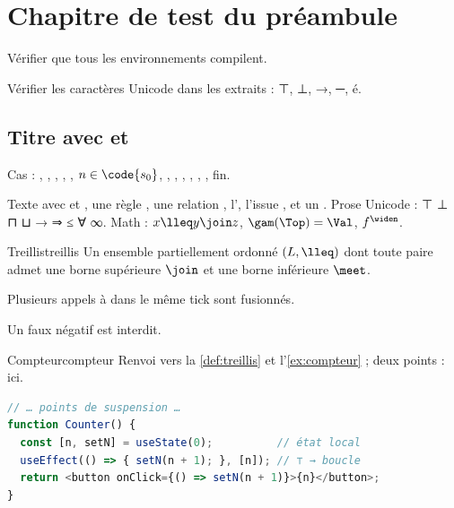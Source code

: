 \chapter{Chapitre de test du préambule}
\label{chap:smoke}

\begin{objectifs}
  \item Vérifier que tous les environnements compilent.
  \item Vérifier les caractères Unicode dans les extraits : ⊤, ⊥, →, ─, é.
\end{objectifs}


\section{Titre avec  et }
Cas : , , \code{\#[test]}, , , $n \in \code{s_0}$,
, , , \code{\ldots},
, , fin.

Texte avec  et , une règle ,
une relation , l', l'issue , et un .
Prose Unicode : ⊤ ⊥ ⊓ ⊔ → ⇒ ≤ ∀ ∞. Math : $x \lleq y \join z$, $\gam(\Top) = \Val$, $f^{\widen}$.

\begin{definition}{Treillis}{treillis}
  Un ensemble partiellement ordonné $(L, \lleq)$ dont toute paire admet une borne supérieure $\join$ et une borne inférieure $\meet$.
\end{definition}

\begin{react}[batching]
  Plusieurs appels à  dans le même tick sont fusionnés.
\end{react}

\begin{piege}
  Un faux négatif est interdit.
\end{piege}

\begin{exemple}{Compteur}{compteur}
Renvoi vers la \cref{def:treillis} et l'\cref{ex:compteur} ; deux points : ici.
\begin{lstlisting}[language=TypeScript,caption={Un compteur — é ⊤ → …}]
// … points de suspension …
function Counter() {
  const [n, setN] = useState(0);          // état local
  useEffect(() => { setN(n + 1); }, [n]); // ⊤ → boucle
  return <button onClick={() => setN(n + 1)}>{n}</button>;
}
\end{lstlisting}
\end{exemple}

